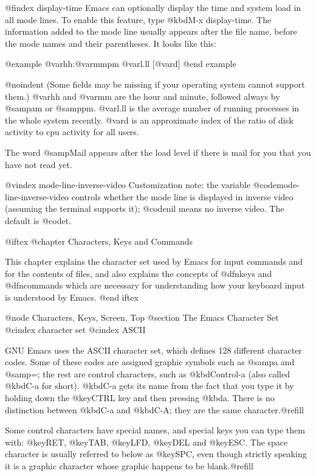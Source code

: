 {{@findex display-time
  Emacs can optionally display the time and system load in all mode lines.
To enable this feature, type @kbd{M-x display-time}.  The information added
to the mode line usually appears after the file name, before the mode names
and their parentheses.  It looks like this:

@example
@var{hh}:@var{mm}pm @var{l.ll} [@var{d}]
@end example

@noindent
(Some fields may be missing if your operating system cannot support them.)
@var{hh} and @var{mm} are the hour and minute, followed always by @samp{am}
or @samp{pm}.  @var{l.ll} is the average number of running processes in the
whole system recently.  @var{d} is an approximate index of the ratio of
disk activity to cpu activity for all users.

The word @samp{Mail} appears after the load level if there is mail for
you that you have not read yet.

@vindex mode-line-inverse-video
  Customization note: the variable @code{mode-line-inverse-video} controls
whether the mode line is displayed in inverse video (assuming the terminal
supports it); @code{nil} means no inverse video.  The default is @code{t}.

@iftex
@chapter Characters, Keys and Commands

  This chapter explains the character set used by Emacs for input commands
and for the contents of files, and also explains the concepts of
@dfn{keys} and @dfn{commands} which are necessary for understanding how
your keyboard input is understood by Emacs.
@end iftex

@node Characters, Keys, Screen, Top
@section The Emacs Character Set
@cindex character set
@cindex ASCII

  GNU Emacs uses the ASCII character set, which defines 128 different
character codes.  Some of these codes are assigned graphic symbols such
as @samp{a} and @samp{=}; the rest are control characters, such as
@kbd{Control-a} (also called @kbd{C-a} for short).  @kbd{C-a} gets its name
from the fact that you type it by holding down the @key{CTRL} key and
then pressing @kbd{a}.  There is no distinction between @kbd{C-a} and
@kbd{C-A}; they are the same character.@refill

  Some control characters have special names, and special keys you can
type them with: @key{RET}, @key{TAB}, @key{LFD}, @key{DEL} and @key{ESC}.
The space character is usually referred to below as @key{SPC}, even though
strictly speaking it is a graphic character whose graphic happens to be
blank.@refill

}}
